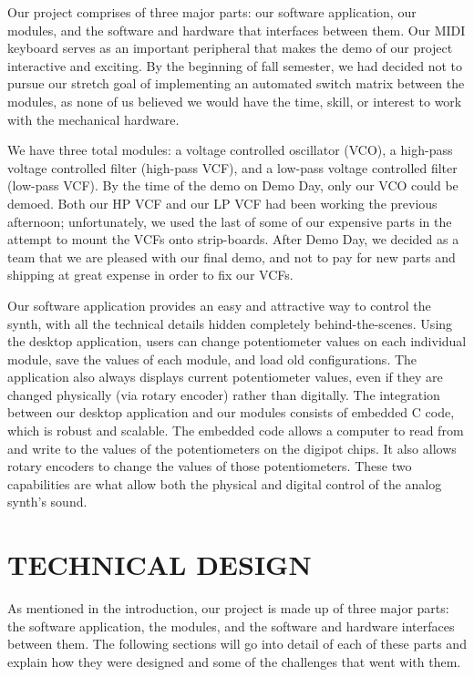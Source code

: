 \documentclass[letterpaper, 12 pt, conference]{ieeeconf}
\begin{document}
Our project comprises of three major parts: our software application, our modules, and the software and hardware that interfaces between them. Our MIDI keyboard serves as an important peripheral that makes the demo of our project interactive and exciting. By the beginning of fall semester, we had decided not to pursue our stretch goal of implementing an automated switch matrix between the modules, as none of us believed we would have the time, skill, or interest to work with the mechanical hardware.

We have three total modules: a voltage controlled oscillator (VCO), a high-pass voltage controlled filter (high-pass VCF), and a low-pass voltage controlled filter (low-pass VCF). By the time of the demo on Demo Day, only our VCO could be demoed. Both our HP VCF and our LP VCF had been working the previous afternoon; unfortunately, we used the last of some of our expensive parts in the attempt to mount the VCFs onto strip-boards. After Demo Day, we decided as a team that we are pleased with our final demo, and not to pay for new parts and shipping at great expense in order to fix our VCFs.

Our software application provides an easy and attractive way to control the synth, with all the technical details hidden completely behind-the-scenes. Using the desktop application, users can change potentiometer values on each individual module, save the values of each module, and load old configurations. The application also always displays current potentiometer values, even if they are changed physically (via rotary encoder) rather than digitally. 
The integration between our desktop application and our modules consists of embedded C code, which is robust and scalable. The embedded code allows a computer to read from and write to the values of the potentiometers on the digipot chips. It also allows rotary encoders to change the values of those potentiometers. These two capabilities are what allow both the physical and digital control of the analog synth’s sound. 

\section{TECHNICAL DESIGN}
As mentioned in the introduction, our project is made up of three major parts: the software application, the modules, and the software and hardware interfaces between them. The following sections will go into detail of each of these parts and explain how they were designed and some of the challenges that went with them.
\end{document}
